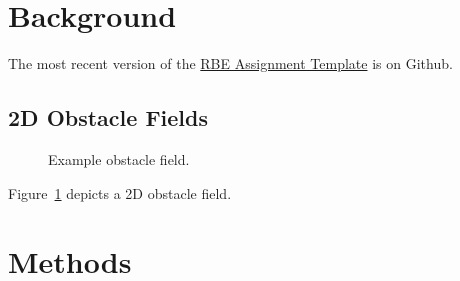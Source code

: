 \documentclass{RBEassignment}
\begin{document}
\def\RBEtitle{Assignment\\Template}
\def\RBEcourse{RBE-001 Generic RBE Course}
\def\RBEsemester{Spring 2025}
\def\RBEauthor{Daniel Montrallo Flickinger, PhD}
\def\RBEnumber{0}
\def\RBEdue{2025-03-04 @ 12:00 UTC}



\RBEassignmentheader{}



\section{Background}


The most recent version of the \href{https://github.com/dmflickinger/RBE550-assignment-template}{RBE Assignment Template} is on Github.  

\lipsum[2]

\subsection{2D Obstacle Fields}


\begin{figure}
\begin{center}
\end{center}
\caption{Example obstacle field.%
\label{fig:obstacleField}}
\end{figure}


Figure~\ref{fig:obstacleField} depicts a 2D obstacle field.



\section{Methods}

\lipsum[1]
\end{document}
